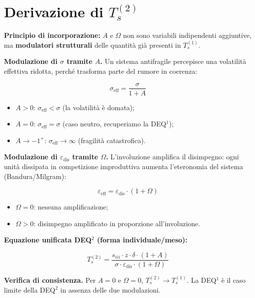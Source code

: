 \section{\texorpdfstring{Derivazione di
\(T_s^{(2)}\)}{Derivazione di T\_s\^{}\{(2)\}}}\label{derivazione-di-t_s2}

\Hypoth{} \textbf{Principio di incorporazione:} \(A\) e \(\Omega\) non
sono variabili indipendenti aggiuntive, ma \textbf{modulatori
strutturali} delle quantità già presenti in \(T_s^{(1)}\).

\textbf{Modulazione di \(\sigma\) tramite \(A\).} Un sistema antifragile
percepisce una volatilità effettiva ridotta, perché trasforma parte del
rumore in coerenza:

\[
\sigma_{\text{eff}} = \frac{\sigma}{1 + A}
\]

\begin{itemize}
\tightlist
\item
  \(A > 0\): \(\sigma_{\text{eff}} < \sigma\) (la volatilità è domata);
\item
  \(A = 0\): \(\sigma_{\text{eff}} = \sigma\) (caso neutro, recuperiamo
  la DEQ$^1$);
\item
  \(A \to -1^+\): \(\sigma_{\text{eff}} \to \infty\) (fragilità
  catastrofica).
\end{itemize}

\textbf{Modulazione di \(\varepsilon_{\text{dis}}\) tramite \(\Omega\).}
L'involuzione amplifica il disimpegno: ogni unità dissipata in
competizione improduttiva aumenta l'eteronomia del sistema
(Bandura/Milgram):

\[
\varepsilon_{\text{eff}} = \varepsilon_{\text{dis}} \cdot (1 + \Omega)
\]

\begin{itemize}
\tightlist
\item
  \(\Omega = 0\): nessuna amplificazione;
\item
  \(\Omega > 0\): disimpegno amplificato in proporzione all'involuzione.
\end{itemize}

\textbf{Equazione unificata DEQ$^2$ (forma individuale/meso):}

\[
\boxed{T_s^{(2)} = \frac{s_{iii} \cdot z \cdot \delta \cdot (1+A)}{\sigma \cdot \varepsilon_{\text{dis}} \cdot (1+\Omega)}}
\]

\Proved{} \textbf{Verifica di consistenza.} Per \(A = 0\) e
\(\Omega = 0\), \(T_s^{(2)} \to T_s^{(1)}\). La DEQ$^1$ è il caso limite
della DEQ$^2$ in assenza delle due modulazioni.



